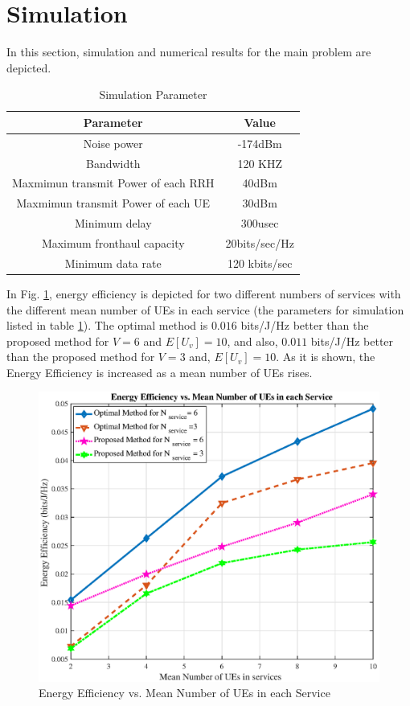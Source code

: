 \documentclass[conference]{IEEEtran}
\begin{document}
\section{Simulation}\label{simul}
In this section, simulation and numerical results for the main problem are depicted.
 \begin{table}
 \caption {Simulation Parameter} \label{table:1a} 
 \begin{center}
  \begin{tabular}{||c c ||} 
  \hline
Parameter & Value \\ [0.5ex] 
  \hline\hline
  Noise power & -174dBm\\
  \hline
  Bandwidth & 120 KHZ \\
  \hline
 Maxmimun transmit Power of each RRH & 40dBm \\
  \hline
   Maxmimun transmit Power of each UE & 30dBm \\
  \hline
  Minimum delay &  300usec \\
  \hline
  Maximum fronthaul capacity  & 20bits/sec/Hz \\ 
   \hline
  Minimum data rate &  120 kbits/sec \\ [1ex] 
  \hline
 \end{tabular}
 \end{center}
 \end{table}
In Fig. \ref{fig:f1a}, energy efficiency is depicted for two different numbers of services with the different mean number of UEs in each service (the parameters for simulation listed in table \ref{table:1a}). The optimal method is $0.016$ bits/J/Hz better than the proposed method for $V = 6$ and $E[U_v] = 10$, and also, $0.011$ bits/J/Hz better than the proposed method for $V = 3$ and, $E[U_v] = 10$. As it is shown, the Energy Efficiency is increased as a mean number of UEs rises.
\begin{figure}%
  \centering
    \includegraphics[width=\linewidth]{figure11}
  \caption{Energy Efficiency vs. Mean Number of UEs in each Service}
  \label{fig:f1a}
\end{figure} 
\end{document}
